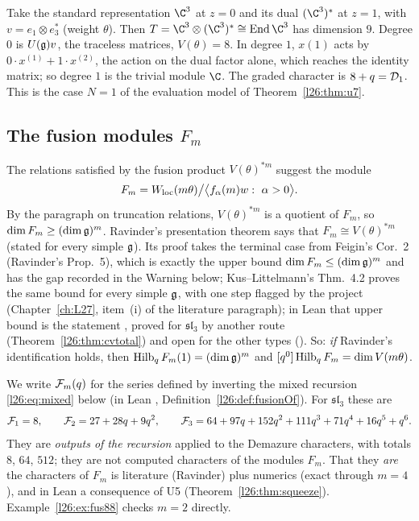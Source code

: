 \begin{example}\label{l26:ex:eval1}
Take the standard representation $\C^3$ at $z=0$ and its dual $(\C^3)^*$ at $z=1$, with $v=e_1\otimes e_3^*$ (weight $\theta$).
Then $T=\C^3\otimes(\C^3)^*\cong\operatorname{End}\C^3$ has dimension $9$. Degree $0$ is $U(\mathfrak g)v$, the traceless
matrices, $V(\theta)=8$. In degree $1$, $x(1)$ acts by $0\cdot x^{(1)}+1\cdot x^{(2)}$, the action on the dual factor alone, which
reaches the identity matrix; so degree $1$ is the trivial module $\C$. The graded character is $8+q=\mathcal D_1$. This is the
case $N=1$ of the evaluation model of Theorem~\ref{l26:thm:u7}.
\end{example}

\subsection{The fusion modules $F_m$}

The relations satisfied by the fusion product $V(\theta)^{*m}$ suggest the module
\begin{equation}\label{l26:eq:Fm}
F_m=\ltwentysixWloc(m\theta)\big/\bigl\langle f_\alpha(m)w:\ \alpha>0\bigr\rangle .
\end{equation}
By the paragraph on truncation relations, $V(\theta)^{*m}$ is a quotient of $F_m$, so $\dim F_m\ge(\dim\mathfrak g)^m$.
Ravinder's presentation theorem says that $F_m\cong V(\theta)^{*m}$ (stated for every simple $\mathfrak g$). Its proof takes the
terminal case from Feigin's Cor.~2 (Ravinder's Prop.~5), which is exactly the upper bound $\dim F_m\le(\dim\mathfrak g)^m$ and has
the gap recorded in the Warning below; Kus--Littelmann's Thm.~4.2 proves the same bound for every simple $\mathfrak g$, with one
step flagged by the project (Chapter~\ref{ch:L27}, item~(i) of the literature paragraph); in Lean that upper bound is the statement , proved for $\mathfrak{sl}_3$
by another route (Theorem~\ref{l26:thm:cvtotal}) and open for the other types (). So: \emph{if} Ravinder's identification holds, then $\operatorname{Hilb}_qF_m(1)=(\dim\mathfrak g)^m$ and
$[q^0]\operatorname{Hilb}_qF_m=\dim V(m\theta)$.

We write $\mathcal F_m(q)$ for the series defined by inverting the mixed recursion \eqref{l26:eq:mixed} below (in Lean
, Definition~\ref{l26:def:fusionOf}). For $\mathfrak{sl}_3$ these are
\begin{equation*}
\mathcal F_1=8,\qquad \mathcal F_2=27+28q+9q^2,\qquad \mathcal F_3=64+97q+152q^2+111q^3+71q^4+16q^5+q^6 .
\end{equation*}
They are \emph{outputs of the recursion} applied to the Demazure characters, with totals $8$, $64$, $512$; they are not computed
characters of the modules $F_m$. That they \emph{are} the characters of $F_m$ is literature (Ravinder) plus numerics (exact through
$m=4$), and in Lean a consequence of U5 (Theorem~\ref{l26:thm:squeeze}). Example~\ref{l26:ex:fus88} checks $m=2$ directly.

